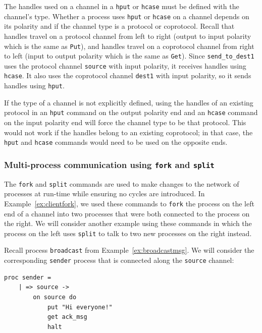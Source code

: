 \documentclass[11pt]{article}
\begin{document}
The handles used on a channel in a \lstinline$hput$ or \lstinline$hcase$ must be defined with the channel's type. 
Whether a process uses \lstinline$hput$ or \lstinline$hcase$ on a channel depends on its polarity and if the channel type is a protocol or coprotocol.
Recall that handles travel on a protocol channel from left to right (output to input polarity which is the same as \lstinline$Put$), and handles travel on a coprotocol channel from right to left (input to output polarity which is the same as \lstinline$Get$).
Since \lstinline$send_to_dest1$ uses the protocol channel \lstinline$source$ with input polarity, it receives handles using \lstinline$hcase$.
It also uses the coprotocol channel \lstinline$dest1$ with input polarity, so it sends handles using \lstinline$hput$.

If the type of a channel is not explicitly defined, using the handles of an existing protocol in an \lstinline$hput$ command on the output polarity end and an \lstinline$hcase$ command on the input polarity end will force the channel type to be that protocol.
This would not work if the handles belong to an existing coprotocol; in that case, the \lstinline$hput$ and \lstinline$hcase$ commands would need to be used on the opposite ends.

\subsubsection{Multi-process communication using {\tt fork} and {\tt split}}
\label{sec:split-fork}

The \lstinline$fork$ and \lstinline$split$ commands are used to make changes to the network of processes at run-time while ensuring no cycles are introduced.
In Example~\ref{ex:clientfork}, we used these commands to \lstinline$fork$ the process on the left end of a channel into two processes that were both connected to the process on the right.
We will consider another example using these commands in which the process on the left uses \lstinline$split$ to talk to two new processes on the right instead.

Recall process \lstinline$broadcast$ from Example~\ref{ex:broadcastmsg}.
We will consider the corresponding \lstinline$sender$ process that is connected along the \lstinline$source$ channel:
\begin{lstlisting}[label=ex:sender, caption=Process that sends messages to broadcast] 
proc sender =
	| => source ->
		on source do
			put "Hi everyone!"
			get ack_msg
			halt
\end{lstlisting} 
\end{document}
